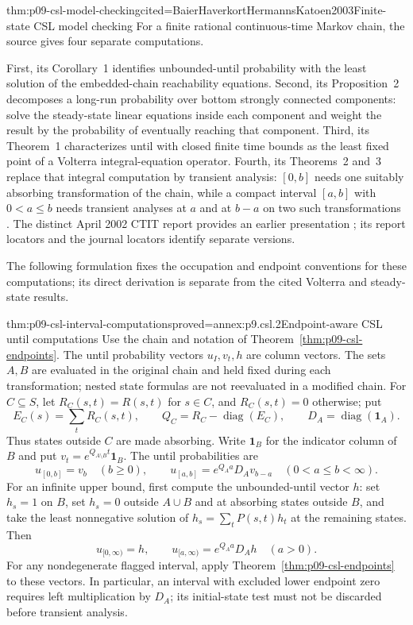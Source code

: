 \begin{hbtheorem}{thm:p09-csl-model-checking}{cited=BaierHaverkortHermannsKatoen2003}{Finite-state CSL model checking}
For a finite rational continuous-time Markov chain, the source gives four
separate computations.

First, its Corollary~1 identifies unbounded-until probability with the least
solution of the embedded-chain reachability equations.  Second, its
Proposition~2 decomposes a long-run probability over bottom strongly connected
components: solve the steady-state linear equations inside each component and
weight the result by the probability of eventually reaching that component.
Third, its Theorem~1 characterizes until with closed finite time bounds as the
least fixed point of a Volterra integral-equation operator.  Fourth, its
Theorems~2 and~3 replace that integral computation by transient analysis:
\([0,b]\) needs one suitably absorbing transformation of the chain, while a compact
interval \([a,b]\) with \(0<a\leq b\) needs transient analyses at \(a\) and at
\(b-a\) on two such transformations
\cite[Prop.~2, Cor.~1, and Thms.~1--3]{BaierHaverkortHermannsKatoen2003}.
The distinct April 2002 CTIT report provides an earlier presentation
\cite{BaierHaverkortHermannsKatoen2002Report}; its report locators and the
journal locators identify separate versions.
\end{hbtheorem}

The following formulation fixes the occupation and endpoint conventions for
these computations; its direct derivation is separate from the cited
Volterra and steady-state results.
\begin{hbtheorem}{thm:p09-csl-interval-computations}{proved=annex:p9.csl.2}{Endpoint-aware CSL until computations}
Use the chain and notation of Theorem~\ref{thm:p09-csl-endpoints}.
The until probability vectors \(u_I,v_t,h\) are column vectors.
The sets \(A,B\) are evaluated in the original chain and held fixed during
each transformation; nested state formulas are not reevaluated in a modified
chain.
For \(C\subseteq S\), let \(R_C(s,t)=R(s,t)\) for \(s\in C\), and
\(R_C(s,t)=0\) otherwise; put
\[
 E_C(s)=\sum_tR_C(s,t),\qquad
 Q_C=R_C-\operatorname{diag}(E_C),\qquad
 D_A=\operatorname{diag}(\mathbf 1_A).
\]
Thus states outside \(C\) are made absorbing.  Write
\(\mathbf 1_B\) for the indicator column of \(B\) and put
\(v_t=e^{Q_{A\setminus B}t}\mathbf 1_B\).  The until probabilities are
\[
 u_{[0,b]}=v_b\quad(b\geq0),\qquad
 u_{[a,b]}=e^{Q_Aa}D_Av_{b-a}\quad(0<a\leq b<\infty).
\]
For an infinite upper bound, first compute the unbounded-until vector \(h\):
set \(h_s=1\) on \(B\), set \(h_s=0\) outside \(A\cup B\) and at
absorbing states outside \(B\), and take the least nonnegative solution of
\(h_s=\sum_tP(s,t)h_t\) at the remaining states.  Then
\[
 u_{[0,\infty)}=h,\qquad
 u_{[a,\infty)}=e^{Q_Aa}D_Ah\quad(a>0).
\]
For any nondegenerate flagged interval, apply Theorem~\ref{thm:p09-csl-endpoints} to
these vectors.  In particular, an interval with excluded lower endpoint zero
requires left multiplication by \(D_A\); its initial-state test must not be
discarded before transient analysis.

\end{hbtheorem}

